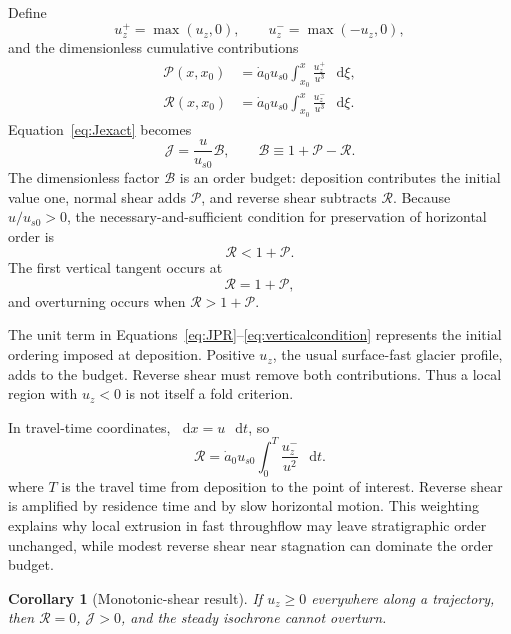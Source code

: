 \documentclass[review]{igs}
\newtheorem{corollary}{Corollary}
\theoremstyle{definition}
\theoremstyle{remark}
\newcommand{\dd}{\mathop{}\!\mathrm{d}}
\newcommand{\Rpos}{\mathcal{P}}
\newcommand{\Rneg}{\mathcal{R}}
\newcommand{\Jord}{\mathcal{J}}
\newcommand{\orderfactor}{\mathcal{B}}
\begin{document}
Define
\begin{equation}
 u_z^+=\max(u_z,0),
 \qquad
 u_z^-=\max(-u_z,0),
\end{equation}
and the dimensionless cumulative contributions
\begin{align}
\Rpos(x,x_0)
&=\dot a_0u_{s0}
\int_{x_0}^{x}\frac{u_z^+}{u^3}\,\dd\xi,
\label{eq:Pdef}\\
\Rneg(x,x_0)
&=\dot a_0u_{s0}
\int_{x_0}^{x}\frac{u_z^-}{u^3}\,\dd\xi.
\label{eq:Rdef}
\end{align}
Equation~\eqref{eq:Jexact} becomes
\begin{equation}
\boxed{
\Jord=\frac{u}{u_{s0}}\orderfactor,
\qquad
\orderfactor\equiv1+\Rpos-\Rneg.
}
\label{eq:JPR}
\end{equation}
The dimensionless factor \(\orderfactor\) is an order budget: deposition contributes the initial value one, normal shear adds \(\Rpos\), and reverse shear subtracts \(\Rneg\). Because \(u/u_{s0}>0\), the necessary-and-sufficient condition for preservation of horizontal order is
\begin{equation}
\boxed{\Rneg<1+\Rpos.}
\label{eq:ordercondition}
\end{equation}
The first vertical tangent occurs at
\begin{equation}
\boxed{\Rneg=1+\Rpos,}
\label{eq:verticalcondition}
\end{equation}
and overturning occurs when \(\Rneg>1+\Rpos\).

The unit term in Equations~\eqref{eq:JPR}--\eqref{eq:verticalcondition} represents the initial ordering imposed at deposition. Positive \(u_z\), the usual surface-fast glacier profile, adds to the budget. Reverse shear must remove both contributions. Thus a local region with \(u_z<0\) is not itself a fold criterion.

In travel-time coordinates, \(\dd x=u\,\dd t\), so
\begin{equation}
\Rneg
=\dot a_0u_{s0}
\int_0^T\frac{u_z^-}{u^2}\,\dd t.
\label{eq:Rtime}
\end{equation}
where \(T\) is the travel time from deposition to the point of interest. Reverse shear is amplified by residence time and by slow horizontal motion. This weighting explains why local extrusion in fast throughflow may leave stratigraphic order unchanged, while modest reverse shear near stagnation can dominate the order budget.

\begin{corollary}[Monotonic-shear result]
If \(u_z\geq0\) everywhere along a trajectory, then \(\Rneg=0\), \(\Jord>0\), and the steady isochrone cannot overturn.
\end{corollary}
\end{document}

